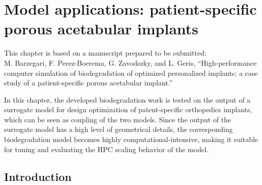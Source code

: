 \chapter{Model applications: patient-specific porous acetabular implants}\label{ch:cup}

\begin{shaded}
This chapter is based on a manuscript prepared to be submitted:\\
M. Barzegari, F. Perez-Boerema, G. Zavodszky, and L. Geris, ``High-performance computer simulation of biodegradation of optimized personalized implants; a case study of a patient-specific porous acetabular implant.''
\end{shaded}

In this chapter, the developed biodegradation work is tested on the output of a surrogate model for design optimization of patent-specific orthopedics implants, which can be seen as coupling of the two models. Since the output of the surrogate model has a high level of geometrical details, the corresponding biodegradation model becomes highly computational-intensive, making it suitable for tuning and evaluating the HPC scaling behavior of the model.

\section{Introduction}



